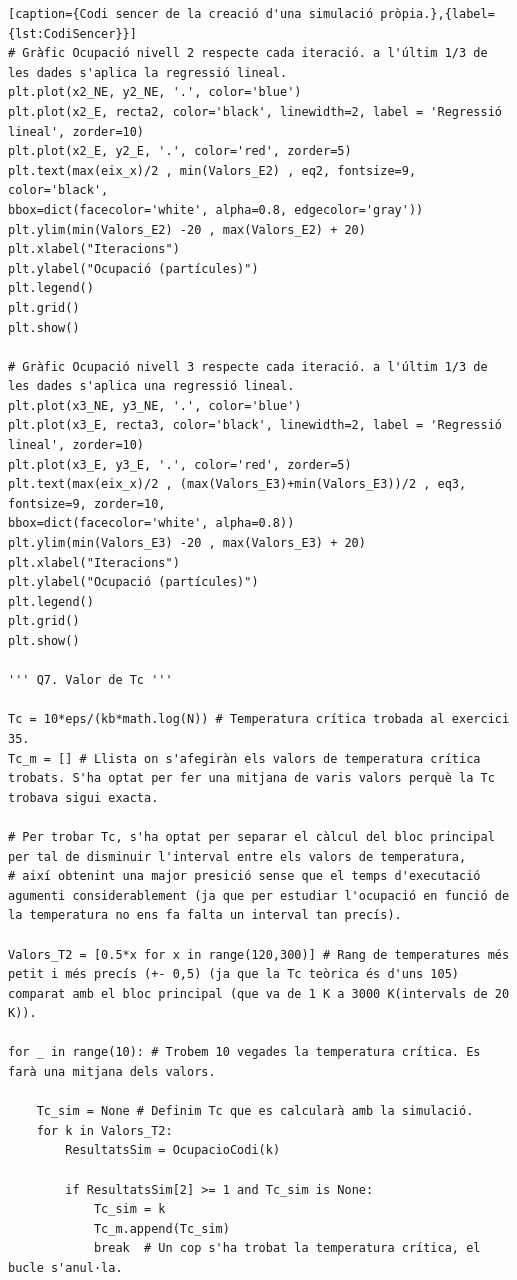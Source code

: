 \documentclass[a4paper,10.5pt]{report}
\begin{document}
\begin{appendices}
\begin{lstlisting}[caption={Codi sencer de la creació d'una simulació pròpia.},{label={lst:CodiSencer}}]
# Gràfic Ocupació nivell 2 respecte cada iteració. a l'últim 1/3 de les dades s'aplica la regressió lineal. 
plt.plot(x2_NE, y2_NE, '.', color='blue')
plt.plot(x2_E, recta2, color='black', linewidth=2, label = 'Regressió lineal', zorder=10)
plt.plot(x2_E, y2_E, '.', color='red', zorder=5)
plt.text(max(eix_x)/2 , min(Valors_E2) , eq2, fontsize=9, color='black', 
bbox=dict(facecolor='white', alpha=0.8, edgecolor='gray'))
plt.ylim(min(Valors_E2) -20 , max(Valors_E2) + 20)
plt.xlabel("Iteracions")
plt.ylabel("Ocupació (partícules)")
plt.legend()
plt.grid()
plt.show()

# Gràfic Ocupació nivell 3 respecte cada iteració. a l'últim 1/3 de les dades s'aplica una regressió lineal. 
plt.plot(x3_NE, y3_NE, '.', color='blue')
plt.plot(x3_E, recta3, color='black', linewidth=2, label = 'Regressió lineal', zorder=10)
plt.plot(x3_E, y3_E, '.', color='red', zorder=5)
plt.text(max(eix_x)/2 , (max(Valors_E3)+min(Valors_E3))/2 , eq3, fontsize=9, zorder=10,
bbox=dict(facecolor='white', alpha=0.8))
plt.ylim(min(Valors_E3) -20 , max(Valors_E3) + 20)
plt.xlabel("Iteracions")
plt.ylabel("Ocupació (partícules)")
plt.legend()
plt.grid()
plt.show()

''' Q7. Valor de Tc '''

Tc = 10*eps/(kb*math.log(N)) # Temperatura crítica trobada al exercici 35. 
Tc_m = [] # Llista on s'afegiràn els valors de temperatura crítica trobats. S'ha optat per fer una mitjana de varis valors perquè la Tc trobava sigui exacta. 

# Per trobar Tc, s'ha optat per separar el càlcul del bloc principal per tal de disminuir l'interval entre els valors de temperatura, 
# així obtenint una major presició sense que el temps d'executació agumenti considerablement (ja que per estudiar l'ocupació en funció de la temperatura no ens fa falta un interval tan precís).

Valors_T2 = [0.5*x for x in range(120,300)] # Rang de temperatures més petit i més precís (+- 0,5) (ja que la Tc teòrica és d'uns 105) comparat amb el bloc principal (que va de 1 K a 3000 K(intervals de 20 K)).

for _ in range(10): # Trobem 10 vegades la temperatura crítica. Es farà una mitjana dels valors. 

	Tc_sim = None # Definim Tc que es calcularà amb la simulació.
	for k in Valors_T2:
		ResultatsSim = OcupacioCodi(k)
		
		if ResultatsSim[2] >= 1 and Tc_sim is None: 
			Tc_sim = k
			Tc_m.append(Tc_sim)
			break  # Un cop s'ha trobat la temperatura crítica, el bucle s'anul·la. 


\end{lstlisting}
\end{appendices}
\end{document}
